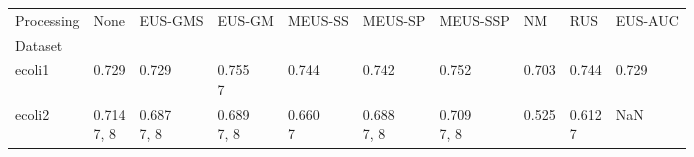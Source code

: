 \begin{tabular}{llllllllll}
\toprule
Processing &                                                     None &                                   EUS-GMS &                                       EUS-GM &                                   MEUS-SS &                                MEUS-SP &                                  MEUS-SSP &                                     NM &                                    RUS &                                   EUS-AUC \\
Dataset                &                                                          &                                           &                                              &                                           &                                        &                                           &                                        &                                        &                                           \\
\midrule
ecoli1                 &                        \makecell{0.729 \\ \scriptsize{}} &         \makecell{0.729 \\ \scriptsize{}} &           \makecell{0.755 \\ \scriptsize{7}} &         \makecell{0.744 \\ \scriptsize{}} &      \makecell{0.742 \\ \scriptsize{}} &         \makecell{0.752 \\ \scriptsize{}} &      \makecell{0.703 \\ \scriptsize{}} &      \makecell{0.744 \\ \scriptsize{}} &         \makecell{0.729 \\ \scriptsize{}} \\
ecoli2                 &                    \makecell{0.714 \\ \scriptsize{7, 8}} &     \makecell{0.687 \\ \scriptsize{7, 8}} &        \makecell{0.689 \\ \scriptsize{7, 8}} &        \makecell{0.660 \\ \scriptsize{7}} &  \makecell{0.688 \\ \scriptsize{7, 8}} &     \makecell{0.709 \\ \scriptsize{7, 8}} &      \makecell{0.525 \\ \scriptsize{}} &     \makecell{0.612 \\ \scriptsize{7}} &                                       NaN \\

\end{tabular}
